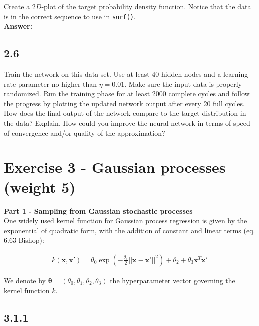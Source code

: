 \documentclass[a4paper]{article}
\begin{document}
Create a $2D$-plot of the target probability density function. Notice that the data is in the correct sequence to use in \texttt{surf()}.\\

\textbf{Answer:}\\








\subsection*{2.6}

Train the network on this data set. Use at least 40 hidden nodes and a learning rate parameter no higher than $\eta = 0.01$. Make sure the input data is properly randomized. Run the training phase for at least 2000 complete cycles and follow the progress by plotting the updated network output after every 20 full cycles. How does the final output of the network compare to the target distribution in the data? Explain. How could you improve the neural network in terms of speed of convergence and/or quality of the approximation?



\section*{Exercise 3 - Gaussian processes (weight 5)}


\textbf{Part 1 - Sampling from Gaussian stochastic processes}\\

One widely used kernel function for Gaussian process regression is given by the exponential of quadratic form, with the addition of constant and linear terms (eq. 6.63 Bishop):

\begin{eqnarray} \label{eq:5}
k(\textbf{x}, \textbf{x}') = \theta_0 \exp(- \frac{\theta_1}{2} || \textbf{x} - \textbf{x}' ||^2) + \theta_2 + \theta_3 \textbf{x}^T \textbf{x}'
\end{eqnarray}

We denote by $\boldsymbol{\theta}  = (\theta_0, \theta_1, \theta_2, \theta_3)$ the hyperparameter vector governing the kernel function $k$.

\subsection*{3.1.1}
\end{document}
